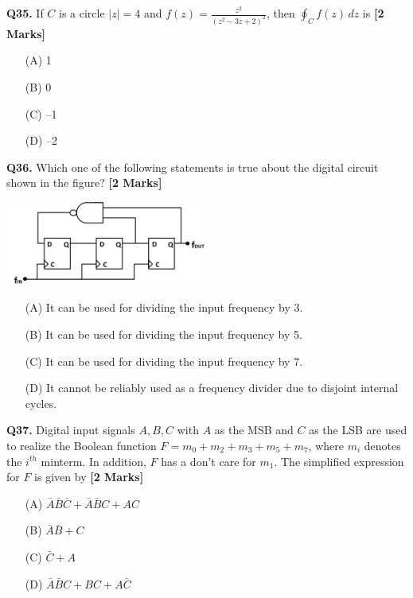 \documentclass[11pt]{article}
\newcommand{\questionb}[2]{
    \noindent\textbf{Q#2.} #1 \hfill \textbf{[2 Marks]}
}
\begin{document}
\questionb{If \( C \) is a circle \( |z| = 4 \) and \( f(z) = \frac{z^2}{(z^2 - 3z + 2)^2} \), then \( \oint_C f(z) \, dz \) is}{35}
\begin{enumerate}
    \item[(A)] 1
    \item[(B)] 0
    \item[(C)] –1
    \item[(D)] –2
\end{enumerate}
\vspace{0.5cm}

\questionb{Which one of the following statements is true about the digital circuit shown in the figure?}{36}
\begin{center}
\includegraphics[width=0.5\textwidth]{figures/36.png}
\end{center}
\begin{enumerate}
    \item[(A)] It can be used for dividing the input frequency by 3.
    \item[(B)] It can be used for dividing the input frequency by 5.
    \item[(C)] It can be used for dividing the input frequency by 7.
    \item[(D)] It cannot be reliably used as a frequency divider due to disjoint internal cycles.
\end{enumerate}
\vspace{0.5cm}

\questionb{Digital input signals \( A, B, C \) with \( A \) as the MSB and \( C \) as the LSB are used to realize the Boolean function \( F = m_0 + m_2 + m_3 + m_5 + m_7 \), where \( m_i \) denotes the \( i^{th} \) minterm. In addition, \( F \) has a don’t care for \( m_1 \). The simplified expression for \( F \) is given by}{37}
\begin{enumerate}
    \item[(A)] \( \bar{A}\bar{B}\bar{C} + \bar{A}\bar{B}C + AC \)
    \item[(B)] \( \bar{A}\bar{B} + C \)
    \item[(C)] \( \bar{C} + A \)
    \item[(D)] \( \bar{A}\bar{B}C + BC + A\bar{C} \)
\end{enumerate}
\vspace{0.5cm}
\end{document}
